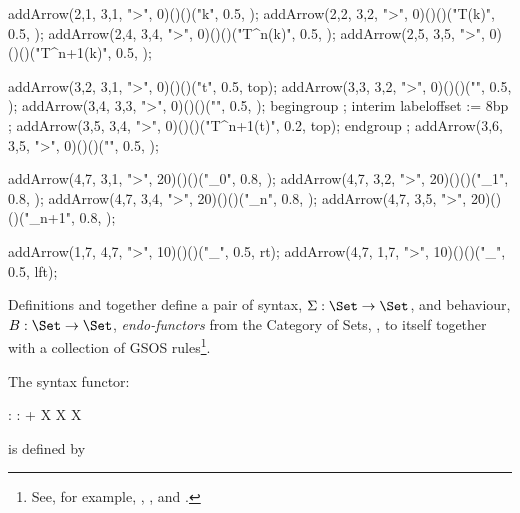   addArrow(2,1, 3,1, ">", 0)()()("k",          0.5, );
  addArrow(2,2, 3,2, ">", 0)()()("T(k)",       0.5, );
  addArrow(2,4, 3,4, ">", 0)()()("T^n(k)",     0.5, );
  addArrow(2,5, 3,5, ">", 0)()()("T^{n+1}(k)", 0.5, );

  addArrow(3,2, 3,1, ">", 0)()()("t",          0.5, top);
  addArrow(3,3, 3,2, ">", 0)()()("",           0.5, );
  addArrow(3,4, 3,3, ">", 0)()()("",           0.5, );
  begingroup ;  interim labeloffset := 8bp ;
  addArrow(3,5, 3,4, ">", 0)()()("T^{n+1}(t)", 0.2, top);
  endgroup ; 
  addArrow(3,6, 3,5, ">", 0)()()("",           0.5, );

  addArrow(4,7, 3,1, ">", 20)()()("_0",     0.8, );
  addArrow(4,7, 3,2, ">", 20)()()("_1",     0.8, );
  addArrow(4,7, 3,4, ">", 20)()()("_n",     0.8, );
  addArrow(4,7, 3,5, ">", 20)()()("_{n+1}", 0.8, );
  
  addArrow(1,7, 4,7, ">", 10)()()("_{\infinity}", 0.5, rt);
  addArrow(4,7, 1,7, ">", 10)()()("_{\infinity}", 0.5, lft);

\stopMPcode \stopformula

\stopMMundi

\startMMundi


\stopMMundi

\startMMundi

Definitions \in[beastieActions] and \in[beastieTests] together define a 
pair of syntax, $\Sigma : \Set \rightarrow \Set$, and behaviour, $B : \Set 
\rightarrow \Set$, \emph{endo-functors} from the Category of Sets, \Set, 
to itself together with a collection of GSOS rules\footnote{See, for 
example, \cite{turiPlotkin1997operationalSemantics}, 
\cite{klin2011bialgebrasSOS}, and \cite{jacobs2017coalgebras}.}. 

The syntax functor: 

\placeformula[+]\startformula\startalign
  \NC \Sigma : \NC \Set \rightarrow \Set           \NR
  \NC \Sigma : \NC {} + X \times X \mapsto X \NR
\stopalign\stopformula

\noindent is defined by

